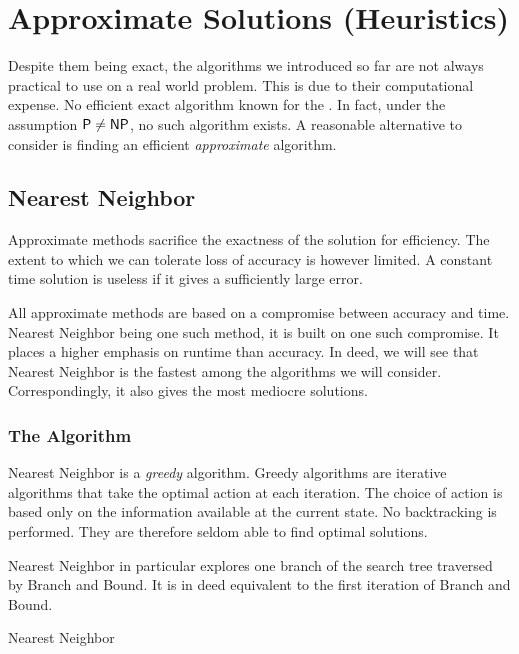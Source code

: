 \chapter{Approximate Solutions (Heuristics)}

Despite them being exact, the algorithms we introduced so far are not always practical to use on a real world problem. This is due to their computational expense. No efficient exact algorithm known for the \TSP. In fact, under the assumption \(\textsf{P}\neq\textsf{NP}\), no such algorithm exists. A reasonable alternative to consider is finding an efficient \emph{approximate} algorithm.

\section{Nearest Neighbor}

    Approximate methods sacrifice the exactness of the solution for efficiency. The extent to which we can tolerate loss of accuracy is however limited. A constant time solution is useless if it gives a sufficiently large error. 
    
    All approximate methods are based on a compromise between accuracy and time. Nearest Neighbor being one such method, it is built on one such compromise. It places a higher emphasis on runtime than accuracy. In deed, we will see that Nearest Neighbor is the fastest among the algorithms we will consider. Correspondingly, it also gives the most mediocre solutions.

    \subsection{The Algorithm}

    Nearest Neighbor is a \emph{greedy} algorithm. Greedy algorithms are iterative algorithms that take the optimal action at each iteration. The choice of action is based only on the information available at the current state. No backtracking is performed. They are therefore seldom able to find optimal solutions.

    Nearest Neighbor in particular explores one branch of the search tree traversed by Branch and Bound. It is in deed equivalent to the first iteration of Branch and Bound. 
    \let\textnormal\ttfamily
        \begin{algorithm}
        \caption{Nearest Neighbor}
        \label{algo:nearest-neighbor}
            \DontPrintSemicolon
             
    \end{algorithm}

